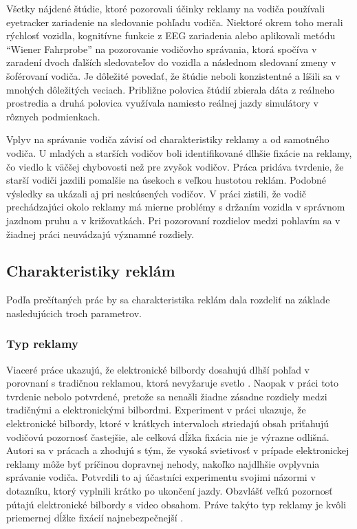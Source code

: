Všetky nájdené štúdie, ktoré pozorovali účinky reklamy na vodiča používali eyetracker zariadenie na sledovanie pohľadu vodiča. Niektoré okrem toho merali rýchlosť vozidla, kognitívne funkcie z EEG zariadenia alebo aplikovali metódu “Wiener Fahrprobe” \cite{WF} na pozorovanie vodičovho správania, ktorá spočíva v zaradení dvoch ďalších sledovateľov do vozidla a následnom sledovaní zmeny v šoférovaní vodiča.  Je dôležité povedať, že štúdie neboli konzistentné a líšili sa v mnohých dôležitých veciach. Približne polovica štúdií zbierala dáta z reálneho prostredia a druhá polovica využívala namiesto reálnej jazdy simulátory v rôznych podmienkach.

Vplyv na správanie vodiča závisí od charakteristiky reklamy a od samotného vodiča. U mladých \cite{stavrinos2016visual} a starších vodičov \cite{belyusar2016field, EDQUIST2011619} boli identifikované dlhšie fixácie na reklamy, čo viedlo k väčšej chybovosti než pre zvyšok vodičov. Práca \cite{horberry200813} pridáva tvrdenie, že starší vodiči jazdili pomalšie na úsekoch s veľkou hustotou reklám. Podobné výsledky sa ukázali aj pri neskúsených vodičov. V práci \cite{bendak2010role} zistili, že vodič prechádzajúci okolo reklamy má mierne problémy s držaním vozidla v správnom jazdnom pruhu a v križovatkách. Pri pozorovaní rozdielov medzi pohlavím sa v žiadnej práci neuvádzajú významné rozdiely.

\subsection{Charakteristiky reklám}

Podľa prečítaných prác by sa charakteristika reklám dala rozdeliť  na základe nasledujúcich troch parametrov.

\subsubsection{Typ reklamy}

Viaceré práce ukazujú, že elektronické bilbordy dosahujú dlhší pohľad v porovnaní s tradičnou reklamou, ktorá nevyžaruje svetlo \cite{OVIEDOTRESPALACIOS201985, beijer, brome}. Naopak v práci \cite{n1} toto tvrdenie nebolo potvrdené, pretože sa nenašli žiadne zásadne rozdiely medzi tradičnými a elektronickými bilbordmi. Experiment v práci \cite{brome} ukazuje, že elektronické bilbordy, ktoré v krátkych intervaloch striedajú obsah priťahujú vodičovú pozornosť častejšie, ale celková dĺžka fixácia nie je výrazne odlišná. Autori sa v prácach \cite{mollu2018driving} a \cite{beijer} zhodujú s tým, že vysoká svietivosť v prípade elektronickej reklamy môže byť príčinou dopravnej nehody, nakoľko najdlhšie ovplyvnia správanie vodiča. Potvrdili to aj účastníci experimentu svojimi názormi v dotazníku, ktorý vyplnili krátko po ukončení jazdy. Obzvlášť veľkú pozornosť pútajú elektronické bilbordy s video obsahom. Práve takýto typ reklamy je kvôli priemernej dĺžke fixácií najnebezpečnejší \cite{yellappan2016exposure, smiley2005traffic}.

